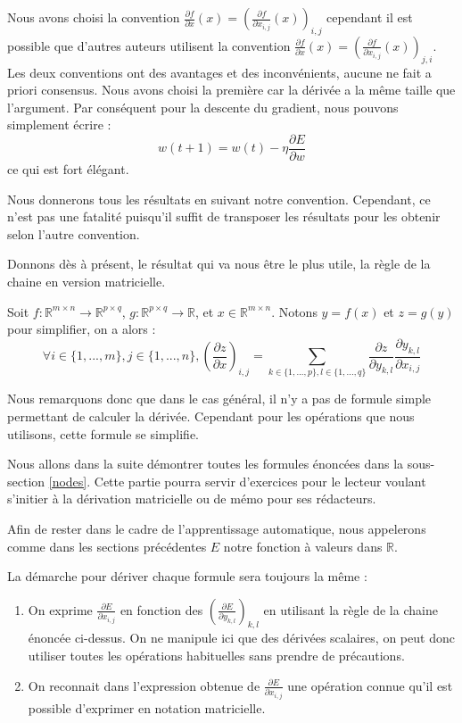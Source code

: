 \begin{remark}
Nous avons choisi la convention $\frac{\partial f}{\partial x}(x) = (\frac{\partial f}{\partial x_{i, j}}(x))_{i, j}$ cependant il est possible que d'autres auteurs utilisent la convention $\frac{\partial f}{\partial x}(x) = (\frac{\partial f}{\partial x_{i, j}}(x))_{j, i}$. Les deux conventions ont des avantages et des inconvénients, aucune ne fait a priori consensus. Nous avons choisi la première car la dérivée a la même taille que l'argument. Par conséquent pour la descente du gradient, nous pouvons simplement écrire :
$$
w(t+1) = w(t) - \eta \frac{\partial E}{\partial w} 
$$
ce qui est fort élégant.

Nous donnerons tous les résultats en suivant notre convention. Cependant, ce n'est pas une fatalité puisqu'il suffit de transposer les résultats pour les obtenir selon l'autre convention.
\end{remark}

Donnons dès à présent, le résultat qui va nous être le plus utile, la règle de la chaine en version matricielle.

\begin{proposition}
Soit $f : \mathbb{R}^{m \times n} \rightarrow \mathbb{R}^{p \times q}$, $g : \mathbb{R}^{p \times q} \rightarrow \mathbb{R}$, et $x \in \mathbb{R}^{m \times n}$. Notons $y = f(x)$ et $z = g(y)$ pour simplifier, on a alors :
$$
\forall i \in \{1, ..., m\}, j \in \{1, ..., n\}, (\frac{\partial z}{\partial x})_{i, j} = \sum_{k \in \{1, ..., p\}, l \in \{1, ..., q\}}{\frac{\partial z}{\partial y_{k, l}}\frac{\partial y_{k, l}}{\partial x_{i, j}}}
$$
\end{proposition}

Nous remarquons donc que dans le cas général, il n'y a pas de formule simple permettant de calculer la dérivée. Cependant pour les opérations que nous utilisons, cette formule se simplifie.

Nous allons dans la suite démontrer toutes les formules énoncées dans la sous-section \ref{nodes}. Cette partie pourra servir d'exercices pour le lecteur voulant s'initier à la dérivation matricielle ou de mémo pour ses rédacteurs.

Afin de rester dans le cadre de l'apprentissage automatique, nous appelerons comme dans les sections précédentes $E$ notre fonction à valeurs dans $\mathbb{R}$.

La démarche pour dériver chaque formule sera toujours la même :
\begin{enumerate}
\item On exprime $\frac{\partial E}{\partial x_{i, j}}$ en fonction des $(\frac{\partial E}{\partial y_{k, l}})_{k, l}$ en utilisant la règle de la chaine énoncée ci-dessus. On ne manipule ici que des dérivées scalaires, on peut donc utiliser toutes les opérations habituelles sans prendre de précautions.
\item On reconnait dans l'expression obtenue de $\frac{\partial E}{\partial x_{i, j}}$ une opération connue qu'il est possible d'exprimer en notation matricielle.
\end{enumerate}

